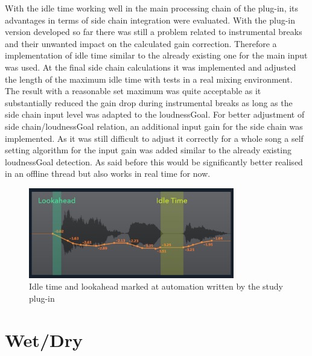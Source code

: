 With the idle time working well in the main processing chain of the plug-in, its advantages in terms of side chain integration were evaluated. With the plug-in version developed so far there was still a problem related to instrumental breaks and their unwanted impact on the calculated gain correction. Therefore a implementation of idle time similar to the already existing one for the main input was used. At the final side chain calculations it was implemented and adjusted the length of the maximum idle time with tests in a real mixing environment. The result with a reasonable set maximum was quite acceptable as it substantially reduced the gain drop during instrumental breaks as long as the side chain input level was adapted to the loudnessGoal. For better adjustment of side chain/loudnessGoal relation, an additional input gain for the side chain was implemented. As it was still difficult to adjust it correctly for a whole song a self setting algorithm for the input gain was added similar to the already existing loudnessGoal detection. As said before this would be significantly better realised in an offline thread but also works in real time for now.\\

\begin{figure}[H]
\includegraphics[width=0.8\textwidth]{images/automation2LookIdle}
	\centering
	\caption{Idle time and lookahead marked at automation written by the study plug-in}
	\label{auto2look}
\end{figure}

\section{Wet/Dry}

